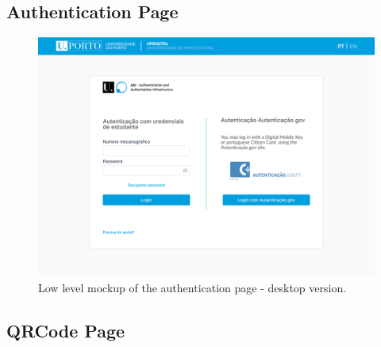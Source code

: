\documentclass[10pt]{article}
\begin{document}
\clearpage %

\subsection{Authentication Page}

\begin{figure}[H]
  \centering
  \includegraphics[width=0.9\linewidth]{report-images/authentication-page-desktop.png}
  \caption{Low level mockup of the authentication page - desktop version.}
  \label{fig:fig-10}
\end{figure}

\clearpage

\subsection{QRCode Page}
\end{document}
